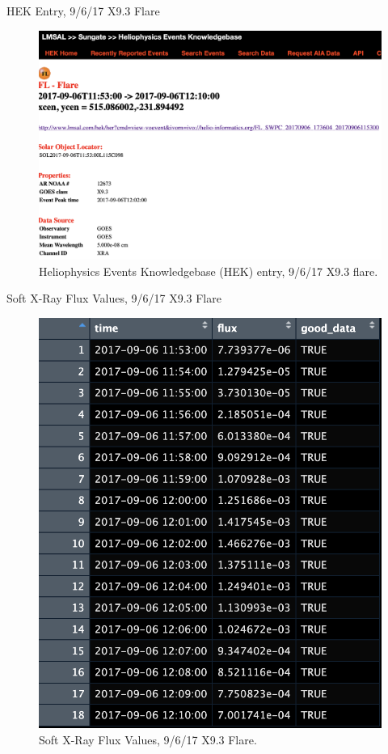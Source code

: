 \documentclass{beamer}
\begin{document}
\begin{frame}{HEK Entry, 9/6/17 X9.3 Flare}
    \begin{figure}
        \centering
        \includegraphics[scale=0.3]{hek_entry_20170906.png}
        \caption{Heliophysics Events Knowledgebase (HEK) entry, 9/6/17 X9.3 flare.}
        \label{fig:hek_entry}
    \end{figure}
\end{frame}

\begin{frame}{Soft X-Ray Flux Values, 9/6/17 X9.3 Flare}
    \begin{figure}
        \centering
        \includegraphics[scale=0.4]{flux_vals_20170906.png}
        \caption{Soft X-Ray Flux Values, 9/6/17 X9.3 Flare.}
        \label{fig:flux_vals_20170906}
    \end{figure}
\end{frame}
\end{document}
